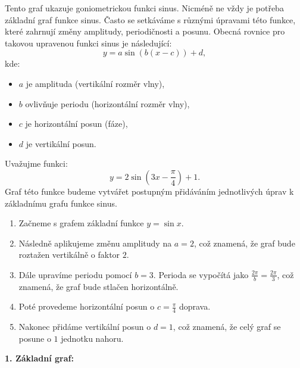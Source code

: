 \documentclass[12pt,a4paper]{article}
\begin{document}
Tento graf ukazuje goniometrickou funkci sinus. Nicméně ne vždy je potřeba základní graf funkce sinus.
Často se setkáváme s různými úpravami této funkce, které zahrnují změny amplitudy, periodičnosti a posunu.
Obecná rovnice pro takovou upravenou funkci sinus je následující:
\[y = a \sin(b(x - c)) + d,\]
kde:
\begin{itemize}
    \item $a$ je amplituda (vertikální rozměr vlny),
    \item $b$ ovlivňuje periodu (horizontální rozměr vlny),
    \item $c$ je horizontální posun (fáze),
    \item $d$ je vertikální posun.
\end{itemize}

\begin{examplebox}
Uvažujme funkci:
\[y = 2 \sin\left(3x - \frac{\pi}{4}\right) + 1.\]
Graf této funkce budeme vytvářet postupným přidáváním jednotlivých úprav k základnímu grafu funkce sinus.
\begin{enumerate}[label=\arabic*.]
    \item Začneme s grafem základní funkce $y = \sin x$.
    \item Následně aplikujeme změnu amplitudy na $a = 2$, což znamená, že graf bude roztažen vertikálně o faktor $2$.
    \item Dále upravíme periodu pomocí $b = 3$. Perioda se vypočítá jako $\frac{2\pi}{b} = \frac{2\pi}{3}$, což znamená, že graf bude stlačen horizontálně.
    \item Poté provedeme horizontální posun o $c = \frac{\pi}{4}$ doprava.
    \item Nakonec přidáme vertikální posun o $d = 1$, což znamená, že celý graf se posune o $1$ jednotku nahoru.
\end{enumerate}

\newpage
\textbf{1. Základní graf:}
\begin{center}
\end{center}
\end{examplebox}
\end{document}
